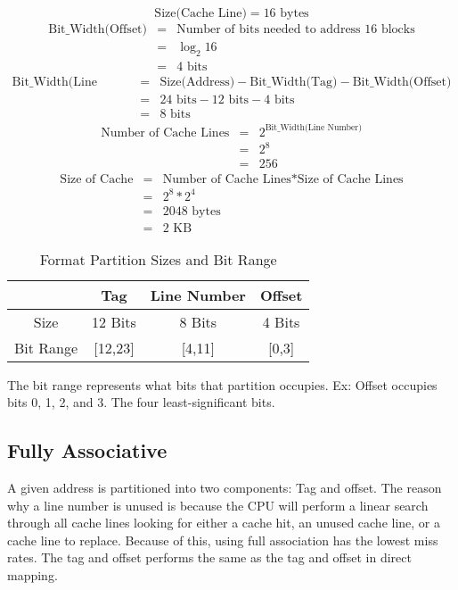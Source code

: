 \documentclass[11pt]{article}
\begin{document}
\[
\text{Size(Cache Line)} = 16 \text{ bytes}
\]
\begin{eqnarray*}
	\text{Bit\_Width(Offset)} &=& \text{Number of bits needed to address 16 blocks}\\
		&=& \log_2 16\\
		&=& 4 \text{ bits}
\end{eqnarray*}
\begin{eqnarray*}
\text{Bit\_Width(Line Number)} &=& \text{Size(Address)} - \text{Bit\_Width(Tag)} - \text{Bit\_Width(Offset)}\\
	&=& 24 \text{ bits} - 12 \text{ bits} - 4 \text{ bits}\\
	&=& 8 \text{ bits}
\end{eqnarray*}
\begin{eqnarray*}
	\text{Number of Cache Lines} &=& 2^\text{Bit\_Width(Line Number)}\\
		&=& 2^8\\
		&=& 256
\end{eqnarray*}
\begin{eqnarray*}
	\text{Size of Cache} &=& \text{Number of Cache Lines} * \text{Size of Cache Lines}\\
		&=& 2^8 * 2^4\\
		&=& 2048 \text{ bytes}\\
		&=& 2 \text{ KB}
\end{eqnarray*}

\begin{table}[H]
	\centering
	\caption*{Format Partition Sizes and Bit Range}
	\begin{tabular}{| c | c | c | c |}
		\hline
					&	Tag		&	Line Number		&	Offset\\
		\hline
		Size		&	12 Bits	&	8 Bits			&	4 Bits\\
		\hline
		Bit Range	&	[12,23]	&	[4,11]	&	[0,3]\\
		\hline
	\end{tabular}
\end{table}

\noindent The bit range represents what bits that partition occupies. Ex: Offset occupies bits 0, 1, 2, and 3. The four least-significant bits.

\subsection{Fully Associative}

A given address is partitioned into two components: Tag and offset. The reason why a line number is unused is because the CPU will perform a linear search through all cache lines looking for either a cache hit, an unused cache line, or a cache line to replace. Because of this, using full association has the lowest miss rates. The tag and offset performs the same as the tag and offset in direct mapping.
\end{document}
